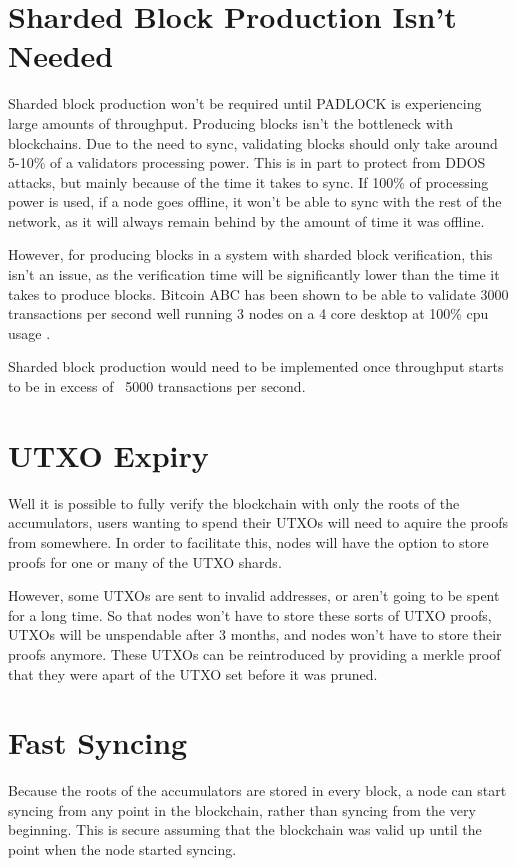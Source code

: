 \documentclass[12pt, letterpaper]{article}
\begin{document}
\section{Sharded Block Production Isn't Needed}
Sharded block production won't be required until PADLOCK is experiencing large
amounts of throughput. Producing blocks isn't the bottleneck with blockchains.
Due to the need to sync, validating blocks should only take around 5-10\% of a
validators processing power. This is in part to protect from DDOS attacks, but
mainly because of the time it takes to sync. If 100\% of processing power is
used, if a node goes offline, it won't be able to sync with the rest of the
network, as it will always remain behind by the amount of time it was offline.

However, for producing blocks in a system with sharded block verification, this
isn't an issue, as the verification time will be significantly lower than the
time it takes to produce blocks. Bitcoin ABC has been shown to be able to
validate 3000 transactions per second well running 3 nodes on a 4 core desktop
at 100\% cpu usage \cite{BitcoinBenchmark}.

Sharded block production would need to be implemented once throughput starts to
be in excess of ~5000 transactions per second.

\section{UTXO Expiry}
Well it is possible to fully verify the blockchain with only the roots of the
accumulators, users wanting to spend their UTXOs will need to aquire the proofs
from somewhere. In order to facilitate this, nodes will have the option to store
proofs for one or many of the UTXO shards.

However, some UTXOs are sent to invalid addresses, or aren't going to be spent
for a long time. So that nodes won't have to store these sorts of UTXO proofs,
UTXOs will be unspendable after 3 months, and nodes won't have to store their
proofs anymore. These UTXOs can be reintroduced by providing a merkle proof that
they were apart of the UTXO set before it was pruned.

\section{Fast Syncing}
Because the roots of the accumulators are stored in every block, a node can
start syncing from any point in the blockchain, rather than syncing from the
very beginning. This is secure assuming that the blockchain was valid up until
the point when the node started syncing.
\end{document}
